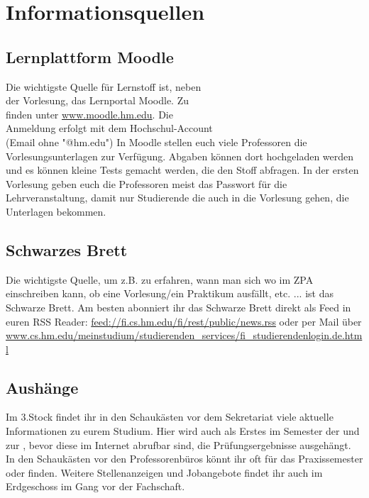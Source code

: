 \section{Informationsquellen}

\subsection{Lernplattform Moodle}
Die wichtigste Quelle für Lernstoff ist, neben \\
der Vorlesung, das Lernportal Moodle. Zu \\
finden unter \url{www.moodle.hm.edu}. Die\\
Anmeldung erfolgt mit dem Hochschul-Account \\
(Email ohne "@hm.edu")\doublebreak
In Moodle stellen euch viele Professoren die Vorlesungsunterlagen zur Verfügung. Abgaben können dort hochgeladen werden und es können kleine Tests gemacht werden, die den Stoff abfragen. In der 
ersten Vorlesung geben euch die Professoren meist das Passwort für die Lehrveranstaltung, damit nur Studierende die auch in die Vorlesung gehen, die Unterlagen bekommen. 

\subsection{Schwarzes Brett}
Die wichtigste Quelle, um z.B. zu erfahren, wann man sich wo im ZPA einschreiben kann, ob eine Vorlesung/ein Praktikum ausfällt, etc. ... ist das Schwarze Brett.\doublebreak 
Am besten abonniert ihr das Schwarze Brett direkt als Feed in euren RSS Reader: \url{feed://fi.cs.hm.edu/fi/rest/public/news.rss} oder per Mail über \url{www.cs.hm.edu/meinstudium/studierenden\_services/fi\_studierendenlogin.de.html} 

\subsection{Aushänge}
Im 3.Stock findet ihr in den Schaukästen vor dem Sekretariat viele 
aktuelle Informationen zu eurem Studium. Hier wird auch als Erstes im 
Semester der  und zur , bevor diese 
im Internet abrufbar sind, die Prüfungsergebnisse ausgehängt. In den 
Schaukästen vor den Professorenbüros könnt ihr oft  
für das Praxissemester oder  finden. 
Weitere Stellenanzeigen und Jobangebote findet ihr auch im 
Erdgeschoss im Gang vor der Fachschaft. 

